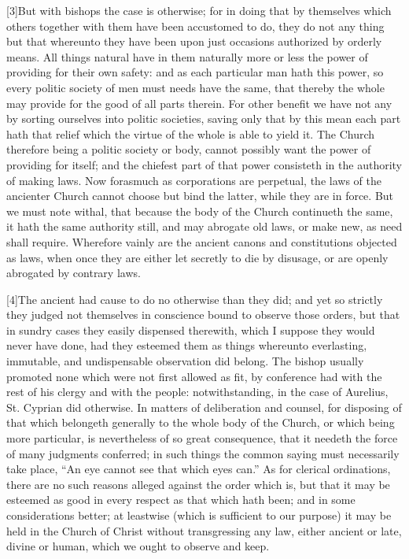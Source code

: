 [3]But with bishops the case is otherwise; for in doing that by themselves which others together with them have been accustomed to do, they do not any thing but that whereunto they have been upon just occasions authorized by orderly means. All things natural have in them naturally more or less the power of providing for their own safety: and as each particular man hath this power, so every politic society of men must needs have the same, that thereby the whole may provide for the good of all parts therein. For other benefit we have not any by sorting ourselves into politic societies, saving only that by this mean each part hath that relief which the virtue of the whole is able to yield it. The Church therefore being a politic society or body, cannot possibly want the power of providing for itself; and the chiefest part of that power consisteth in the authority of making laws. Now forasmuch as corporations are perpetual, the laws of the ancienter Church cannot choose but bind the latter, while they are in force. But we must note withal, that because the body of the Church  continueth the same, it hath the same authority still, and may abrogate old laws, or make new, as need shall require. Wherefore vainly are the ancient canons and constitutions objected as laws, when once they are either let secretly to die by disusage, or are openly abrogated by contrary laws.

[4]The ancient had cause to do no otherwise than they did; and yet so strictly they judged not themselves in conscience bound to observe those orders, but that in sundry cases they easily dispensed therewith, which I suppose they would never have done, had they esteemed them as things whereunto everlasting, immutable, and undispensable observation did belong. The bishop usually promoted none which were not first allowed as fit, by conference had with the rest of his clergy and with the people: notwithstanding, in the case of Aurelius, St. Cyprian did otherwise. In matters of deliberation and counsel, for disposing of that which belongeth generally to the whole body of the Church, or which being more particular, is nevertheless of so great consequence, that it needeth the force of many judgments conferred; in such things the common saying must necessarily take place, “An eye cannot see that which eyes can.” As for clerical ordinations, there are no such reasons alleged against the order which is, but that it may be esteemed as good in every respect as that which hath been; and in some considerations better; at leastwise (which is sufficient to our purpose) it may be held in the Church of Christ without transgressing any law, either ancient or late, divine or human, which we ought to observe and keep.


